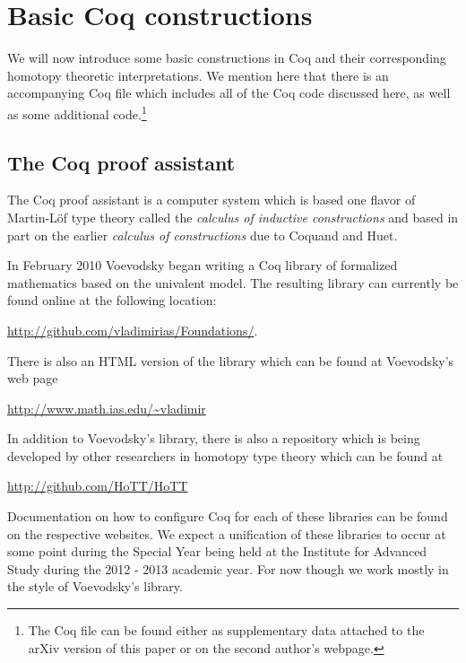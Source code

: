 
\section{Basic Coq constructions} \label{sec2}

We will now introduce some basic constructions in Coq and their
corresponding homotopy theoretic interpretations.  We mention here
that there is an accompanying Coq file which includes all of the Coq
code discussed here, as well as some additional code.\footnote{The
  Coq file can be found either as supplementary data attached to the
  arXiv version of this paper or on the second author's webpage.}

\subsection{The Coq proof assistant} \label{Coq}

The Coq proof assistant \cite{Coq,Bertot:2004uj,Chlipala:CP} is a
computer system which is based one flavor of Martin-L\"of type theory
called the \emph{calculus of inductive constructions} and based in
part on the earlier \emph{calculus of constructions}
\cite{Coquand:1988eq} due to Coquand and Huet. 

In February 2010 Voevodsky \cite{Vo2012a} began writing a Coq library
of formalized mathematics based on the univalent model.  The resulting
library can currently be found online at the following location:
\begin{center}
\url{http://github.com/vladimirias/Foundations/}. 
\end{center}
There is also an HTML version of the library which can be found at Voevodsky's web page
\begin{center}
\url{http://www.math.ias.edu/~vladimir}
\end{center}
In addition to Voevodsky's library, there is also a repository which
is being developed by other researchers in homotopy type theory which
can be found at
\begin{center}
  \url{http://github.com/HoTT/HoTT}
\end{center}
Documentation on how to configure Coq for each of these libraries can
be found on the respective websites.  We expect a unification of these
libraries to occur at some point during the Special Year being held at
the Institute for Advanced Study during the 2012 - 2013 academic year.
For now though we work mostly in the style of Voevodsky's library.

